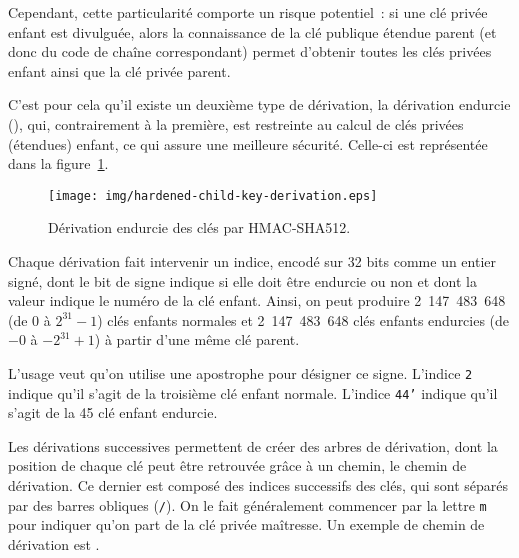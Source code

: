 Cependant, cette particularité comporte un risque potentiel~: si une clé privée enfant est divulguée, alors la connaissance de la clé publique étendue parent (et donc du code de chaîne correspondant) permet d'obtenir toutes les clés privées enfant ainsi que la clé privée parent.


C'est pour cela qu'il existe un deuxième type de dérivation, la dérivation endurcie (), qui, contrairement à la première, est restreinte au calcul de clés privées (étendues) enfant, ce qui assure une meilleure sécurité. Celle-ci est représentée dans la figure~\ref{fig:hardened-child-key-derivation}.

\begin{figure}[h]
  \centering
  \texttt{[image: img/hardened-child-key-derivation.eps]}
  \caption{Dérivation endurcie des clés par HMAC-SHA512.}
  \label{fig:hardened-child-key-derivation}
\end{figure}

Chaque dérivation fait intervenir un indice, encodé sur 32 bits comme un entier signé, dont le bit de signe indique si elle doit être endurcie ou non et dont la valeur indique le numéro de la clé enfant. Ainsi, on peut produire 2~147~483~648 (de $0$ à $2^{31} - 1$) clés enfants normales et 2~147~483~648 clés enfants endurcies (de $-0$ à $- 2^{31} + 1$) à partir d'une même clé parent.

L'usage veut qu'on utilise une apostrophe pour désigner ce signe. L'indice \texttt{2} indique qu'il s'agit de la troisième clé enfant normale. L'indice \texttt{44'} indique qu'il s'agit de la 45\ieme{} clé enfant endurcie.


Les dérivations successives permettent de créer des arbres de dérivation, dont la position de chaque clé peut être retrouvée grâce à un chemin, le chemin de dérivation. Ce dernier est composé des indices successifs des clés, qui sont séparés par des barres obliques (\texttt{/}). On le fait généralement commencer par la lettre \texttt{m} pour indiquer qu'on part de la clé privée maîtresse. Un exemple de chemin de dérivation est .

